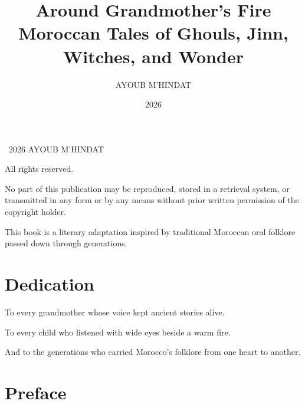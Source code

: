 \documentclass[12pt,openany]{book}
\title{
\vspace{2cm}
{\Huge\bfseries Around Grandmother's Fire}\\[0.7cm]
{\Large Moroccan Tales of Ghouls, Jinn, Witches, and Wonder}
}
\author{AYOUB M'HINDAT}
\date{2026}
\begin{document}
\pagestyle{fancy}

\fancyhf{}

\fancyhead{}              %

\fancyfoot[C]{\thepage}   %

\renewcommand{\headrulewidth}{0pt}

\renewcommand{\footrulewidth}{0pt}







\frontmatter

\maketitle

\thispagestyle{empty}

\vspace*{\fill}

\begin{center}
\textcopyright\ 2026 AYOUB M'HINDAT
\thispagestyle{empty}

All rights reserved.

No part of this publication may be reproduced,
stored in a retrieval system, or transmitted in any
form or by any means without prior written permission
of the copyright holder.

This book is a literary adaptation inspired by
traditional Moroccan oral folklore passed down
through generations.
\end{center}

\vspace*{\fill}

\clearpage

\chapter*{Dedication}
\thispagestyle{plain}

To every grandmother whose voice kept ancient stories alive.

To every child who listened with wide eyes beside a warm fire.

And to the generations who carried Morocco's folklore from one heart to another.

\clearpage

\chapter*{Preface}
\thispagestyle{plain}
\end{document}
